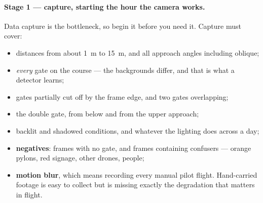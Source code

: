 \paragraph{Stage 1 --- capture, starting the hour the camera works.}
Data capture is the bottleneck, so begin it before you need it. Capture must cover:
\begin{itemize}
\item distances from about \SI{1}{m} to \SI{15}{m}, and all approach angles including oblique;
\item \emph{every} gate on the course --- the backgrounds differ, and that is what a detector learns;
\item gates partially cut off by the frame edge, and two gates overlapping;
\item the double gate, from below and from the upper approach;
\item backlit and shadowed conditions, and whatever the lighting does across a day;
\item \textbf{negatives}: frames with no gate, and frames containing confusers --- orange pylons, red
signage, other drones, people;
\item \textbf{motion blur}, which means recording every manual pilot flight. Hand-carried footage is
easy to collect but is missing exactly the degradation that matters in flight.
\end{itemize}

